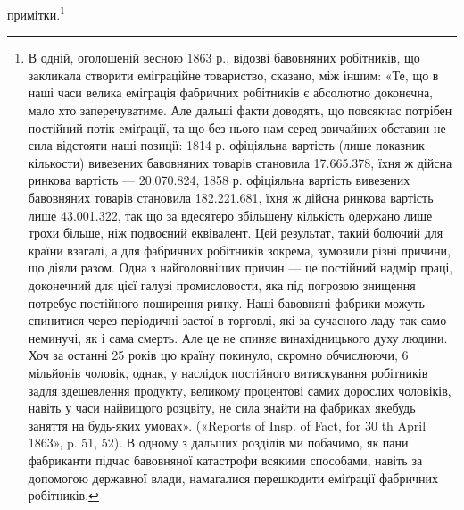 примітки.\footnote{
В одній, оголошеній весною 1863 р., відозві бавовняних робітників,
що закликала створити еміграційне товариство, сказано, між іншим:
«Те, що в наші часи велика еміграція фабричних робітників є абсолютно
доконечна, мало хто заперечуватиме. Але дальші факти доводять, що
повсякчас потрібен постійний потік еміґрації, та що без нього нам серед
звичайних обставин не сила відстояти наші позиції: 1814 р. офіціяльна
вартість (лише показник кількости) вивезених бавовняних товарів становила
\num{17.665.378}, їхня ж дійсна ринкова вартість —
\num{20.070.824}, 1858 р. офіціяльна вартість вивезених бавовняних
товарів становила \num{182.221.681}, їхня ж дійсна
ринкова вартість лише \num{43.001.322}, так що за вдесятеро
збільшену кількість одержано лише трохи більше, ніж подвоєний еквівалент.
Цей результат, такий болючий для країни взагалі, а для фабричних
робітників зокрема, зумовили різні причини, що діяли разом. Одна
з найголовніших причин — це постійний надмір праці, доконечний для
цієї галузі промисловости, яка під погрозою знищення потребує постійного
поширення ринку. Наші бавовняні фабрики можуть спинитися через
періодичні застої в торговлі, які за сучасного ладу так само неминучі,
як і сама смерть. Але це не спиняє винахідницького духу людини. Хоч
за останні 25 років цю країну покинуло, скромно обчислюючи, 6 мільйонів
чоловік, однак, у наслідок постійного витискування робітників задля
здешевлення продукту, великому процентові самих дорослих чоловіків,
навіть у часи найвищого розцвіту, не сила знайти на фабриках якебудь
заняття на будь-яких умовах». («Reports of Insp. of Fact, for 30 th April
1863», p. 51, 52). В одному з дальших розділів ми побачимо, як пани
фабриканти підчас бавовняної катастрофи всякими способами, навіть за
допомогою державної влади, намагалися перешкодити еміґрації фабричних
робітників.
}
\parbreak{}  %
